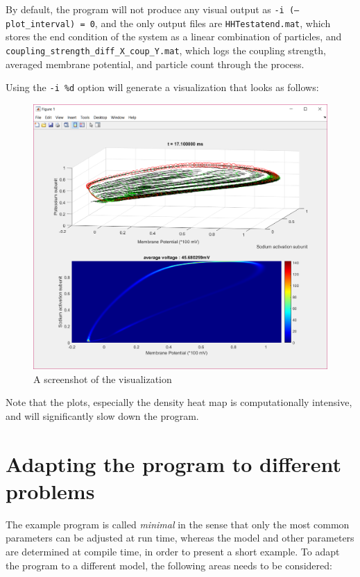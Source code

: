 \documentclass[10pt]{article} %
\begin{document}
By default, the program will not produce any visual output as \texttt{-i (--plot\_interval) = 0}, and the only output files are \texttt{HHTestatend.mat}, which stores the end condition of the system as a linear combination of particles, and \texttt{coupling\_strength\_diff\_X\_coup\_Y.mat}, which logs the coupling strength, averaged membrane potential, and particle count through the process. 

Using the \texttt{-i \%d} option will generate a visualization that looks as follows: 
\begin{figure}[H]
\includegraphics[width=\textwidth]{visualization_screenshot}
\caption{A screenshot of the visualization}
\end{figure}
Note that the plots, especially the density heat map is computationally intensive, and will significantly slow down the program. 
\section{Adapting the program to different problems}
The example program is called \emph{minimal} in the sense that only the most common parameters can be adjusted at run time, whereas the model and other parameters are determined at compile time, in order to present a short example. To adapt the program to a different model, the following areas needs to be considered: 
\end{document}
